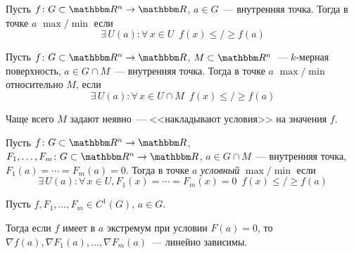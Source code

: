 \documentclass[12pt,timbord]{../../../notes}
\begin{document}
\begin{defn}\label{defn:diffspace::condextremahandwave::extrema}
  Пусть $f\colon G \subset \R^n \to \R$, $a\in G$~--- внутренняя точка. Тогда в точке $a$
  $\max/\min$ если
  \[
    \exists\, U(a) \colon \forall\, x\in U \;\: f(x) \leqslant/\geqslant f(a)
  \]
\end{defn}
\begin{defn}\label{defn:diffspace::condextremahandwave::subsetextrema}
  Пусть $f\colon G \subset \R^n \to \R$, $M\subset\R^n$~--- $k$-мерная поверхность,
  $a\in G\cap M$~--- внутренняя точка. Тогда в точке $a$
  $\max/\min$ относительно $M$, если
  \[
    \exists\, U(a) \colon \forall\, x\in U\cap M \;\: f(x) \leqslant/\geqslant f(a)
  \]
\end{defn}

Чаще всего $M$ задают неявно~--- <<накладывают условия>> на значения $f$.

\begin{defn}\label{defn:diffspace::condextremahandwave::condextrema}
  Пусть $f\colon G \subset \R^n \to \R$, $F_1, \dotsc, F_m \colon G \subset \R^n \to \R$,
  $a\in G\cap M$~--- внутренняя точка, $F_1(a) = \dotsb = F_m(a) = 0$.
  Тогда в точке $a$ \emph{условный} $\max/\min$ если
  \[
    \exists\, U(a) \colon \forall\, x\in U, F_1(x) = \dotsb = F_m(x) = 0\;\: 
    f(x) \leqslant/\geqslant f(a)
  \]
\end{defn}

\begin{thrm}\label{thrm:diffspace::condextrema}
  Пусть $f, F_1, \dotsc, F_m \in C^1(G)$,  $a\in G$. 
  
  Тогда если $f$ имеет в $a$ экстремум при условии $F(a) = 0$, то 
  $\nabla f(a), \nabla F_1(a), \dotsc, \nabla F_m(a)$~--- линейно зависимы.
\end{thrm}
\end{document}
